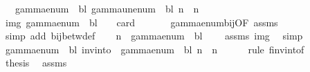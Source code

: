 \begin{isabellebody}
\ \ \ {\isachardoublequoteopen}gamma{\isacharunderscore}{\kern0pt}enum\ {\isasymGamma}\ bl\ {\isacharparenleft}{\kern0pt}gamma{\isacharunderscore}{\kern0pt}unenum\ {\isasymGamma}\ bl\ n{\isacharparenright}{\kern0pt}\ {\isacharequal}{\kern0pt}\ n{\isachardoublequoteclose}\isanewline
%
\isadelimproof
%
\endisadelimproof
%
\isatagproof
{}\isamarkupfalse%
\ {\isacharminus}{\kern0pt}\isanewline
\ \ \isamarkupfalse%
\ img{\isacharcolon}{\kern0pt}\ {\isachardoublequoteopen}gamma{\isacharunderscore}{\kern0pt}enum\ {\isasymGamma}\ bl\ {\isacharbackquote}{\kern0pt}\ {\isasymGamma}\ {\isacharequal}{\kern0pt}\ {\isacharbraceleft}{\kern0pt}{\isachardot}{\kern0pt}{\isachardot}{\kern0pt}{\isacharless}{\kern0pt}card\ {\isasymGamma}{\isacharbraceright}{\kern0pt}{\isachardoublequoteclose}\isanewline
\ \ \ \ \isamarkupfalse%
\ gamma{\isacharunderscore}{\kern0pt}enum{\isacharunderscore}{\kern0pt}bij{\isacharbrackleft}{\kern0pt}OF\ assms{\isacharparenleft}{\kern0pt}{}{\isacharparenright}{\kern0pt}{\isacharbrackright}{\kern0pt}\ \isamarkupfalse%
\ {\isacharparenleft}{\kern0pt}simp\ add{\isacharcolon}{\kern0pt}\ bij{\isacharunderscore}{\kern0pt}betw{\isacharunderscore}{\kern0pt}def{\isacharparenright}{\kern0pt}\isanewline
\ \ \isamarkupfalse%
\ {\isachardoublequoteopen}n\ {\isasymin}\ gamma{\isacharunderscore}{\kern0pt}enum\ {\isasymGamma}\ bl\ {\isacharbackquote}{\kern0pt}\ {\isasymGamma}{\isachardoublequoteclose}\ \isamarkupfalse%
\ assms{\isacharparenleft}{\kern0pt}{}{\isacharparenright}{\kern0pt}\ img\ \isamarkupfalse%
\ simp\isanewline
\ \ \isamarkupfalse%
\ {\isachardoublequoteopen}gamma{\isacharunderscore}{\kern0pt}enum\ {\isasymGamma}\ bl\ {\isacharparenleft}{\kern0pt}inv{\isacharunderscore}{\kern0pt}into\ {\isasymGamma}\ {\isacharparenleft}{\kern0pt}gamma{\isacharunderscore}{\kern0pt}enum\ {\isasymGamma}\ bl{\isacharparenright}{\kern0pt}\ n{\isacharparenright}{\kern0pt}\ {\isacharequal}{\kern0pt}\ n{\isachardoublequoteclose}\isanewline
\ \ \ \ \isamarkupfalse%
\ {\isacharparenleft}{\kern0pt}rule\ f{\isacharunderscore}{\kern0pt}inv{\isacharunderscore}{\kern0pt}into{\isacharunderscore}{\kern0pt}f{\isacharparenright}{\kern0pt}\isanewline
\ \ \isamarkupfalse%
\ {\isacharquery}{\kern0pt}thesis\ \isamarkupfalse%
\ assms{\isacharparenleft}{\kern0pt}{}{\isacharparenright}{\kern0pt}\ \isamarkupfalse%

\end{isabellebody}
